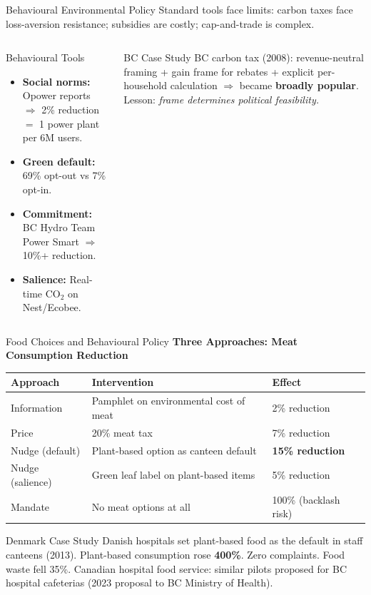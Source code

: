 \documentclass[aspectratio=169]{beamer}
\begin{document}
\begin{frame}{Behavioural Environmental Policy}
Standard tools face limits: carbon taxes face loss-aversion resistance; subsidies are costly; cap-and-trade is complex.
\begin{columns}
\begin{exampleblock}{Behavioural Tools}
\begin{itemize}\small
  \item \textbf{Social norms:} Opower reports $\Rightarrow$ 2\% reduction $=$ 1 power plant per 6M users.
  \item \textbf{Green default:} 69\% opt-out vs 7\% opt-in.
  \item \textbf{Commitment:} BC Hydro Team Power Smart $\Rightarrow$ 10\%+ reduction.
  \item \textbf{Salience:} Real-time CO$_2$ on Nest/Ecobee.
\end{itemize}
\end{exampleblock}
\begin{alertblock}{BC Case Study}
BC carbon tax (2008): revenue-neutral framing + gain frame for rebates + explicit per-household calculation $\Rightarrow$ became \textbf{broadly popular}. Lesson: \textit{frame determines political feasibility.}
\end{alertblock}
\end{columns}
\end{frame}

\begin{frame}{Food Choices and Behavioural Policy}
\textcolor{beblue}{\textbf{Three Approaches: Meat Consumption Reduction}}
\begin{center}\small
\begin{tabular}{lp{4cm}l}
\toprule
\textbf{Approach} & \textbf{Intervention} & \textbf{Effect}\\
\midrule
Information & Pamphlet on environmental cost of meat & 2\% reduction\\
Price & 20\% meat tax & 7\% reduction\\
\rowcolor{softpurple}
Nudge (default) & Plant-based option as canteen default & \textbf{15\% reduction}\\
Nudge (salience) & Green leaf label on plant-based items & 5\% reduction\\
Mandate & No meat options at all & 100\% (backlash risk)\\
\bottomrule
\end{tabular}
\end{center}
\begin{exampleblock}{Denmark Case Study}
Danish hospitals set plant-based food as the default in staff canteens (2013). Plant-based consumption rose \textbf{400\%}. Zero complaints. Food waste fell 35\%. Canadian hospital food service: similar pilots proposed for BC hospital cafeterias (2023 proposal to BC Ministry of Health).
\end{exampleblock}
\end{frame}
\end{document}
